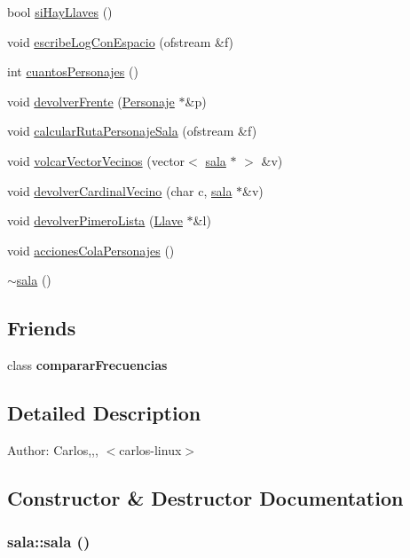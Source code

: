\begin{CompactItemize}
\item 
bool \hyperlink{classsala_deee4cbad1198682fd86962d35aea256}{siHayLlaves} ()
\item 
void \hyperlink{classsala_f02e9b4d4608076a48e51f2c4ddf87d4}{escribeLogConEspacio} (ofstream \&f)
\item 
int \hyperlink{classsala_096e4d5f4a0389e546d97167c3c24f81}{cuantosPersonajes} ()
\item 
void \hyperlink{classsala_3717b76f3e6c98efd83fda02da5a1a06}{devolverFrente} (\hyperlink{classPersonaje}{Personaje} $\ast$\&p)
\item 
void \hyperlink{classsala_0c2411487cc9256b0ce9acfff8d48ded}{calcularRutaPersonajeSala} (ofstream \&f)
\item 
void \hyperlink{classsala_18ca39a6c0fea0cc2a0d155304b007fb}{volcarVectorVecinos} (vector$<$ \hyperlink{classsala}{sala} $\ast$ $>$ \&v)
\item 
void \hyperlink{classsala_c6ee6cab664ae4efa88eb4b7779b1498}{devolverCardinalVecino} (char c, \hyperlink{classsala}{sala} $\ast$\&v)
\item 
void \hyperlink{classsala_376c8d9684f212f6e8a8d8316f2ab733}{devolverPimeroLista} (\hyperlink{classLlave}{Llave} $\ast$\&l)
\item 
void \hyperlink{classsala_feef4f1219a7a014f58415eae0ff2e2b}{accionesColaPersonajes} ()
\item 
\hyperlink{classsala_108d16054e4c939568ab2c301a5cea83}{$\sim$sala} ()
\end{CompactItemize}
\subsection*{Friends}
\begin{CompactItemize}
\item 
\hypertarget{classsala_a48720e6448a633e51018e837eb49890}{
class \textbf{compararFrecuencias}}
\label{classsala_a48720e6448a633e51018e837eb49890}

\end{CompactItemize}


\subsection{Detailed Description}
\begin{Desc}
\item[Author:]Carlos,,, $<$carlos-linux$>$ \end{Desc}


\subsection{Constructor \& Destructor Documentation}
\hypertarget{classsala_780a8c359e96eaf55403409c019d536a}{
\subsubsection[sala]{\setlength{\rightskip}{0pt plus 5cm}sala::sala ()}}
\label{classsala_780a8c359e96eaf55403409c019d536a}


